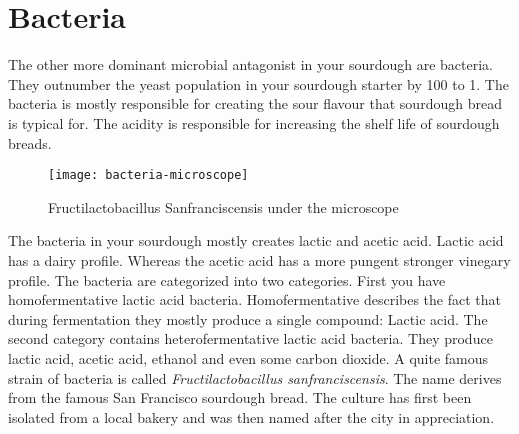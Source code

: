 \section{Bacteria}

The other more dominant microbial antagonist in your sourdough
are bacteria. They outnumber the yeast population in your sourdough
starter by 100 to 1. The bacteria is mostly responsible for creating
the sour flavour that sourdough bread is typical for. The acidity
is responsible for increasing the shelf life of sourdough breads.
\cite{shelflife+acidity}

\begin{figure}
  \texttt{[image: bacteria-microscope]}
  \caption{Fructilactobacillus Sanfranciscensis under the microscope}
  \label{lactobacillus-franciscensis-microscope}
\end{figure}

The bacteria in your sourdough mostly creates lactic and acetic acid. Lactic acid
has a dairy profile. Whereas the acetic acid has a more pungent
stronger vinegary profile. The bacteria are categorized into
two categories. First you have homofermentative lactic acid bacteria.
Homofermentative describes the fact that during fermentation
they mostly produce a single compound: Lactic acid. The second
category contains heterofermentative lactic acid bacteria. They
produce lactic acid, acetic acid, ethanol and even some carbon
dioxide. A quite famous strain of bacteria is called
\emph{Fructilactobacillus sanfranciscensis}. The name derives
from the famous San Francisco sourdough bread. The culture has
first been isolated from a local bakery and was then named
after the city in appreciation.

